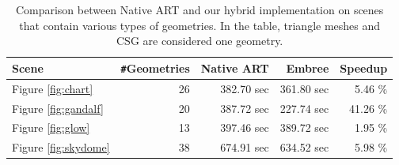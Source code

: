 \begin{table}
	\centering
	{\footnotesize\sf
		\begin{tabular}{lrrrr}
			\toprule
			Scene & \Verb!#!Geometries & Native ART & Embree & Speedup \\ 
			\midrule
			Figure \ref{fig:chart} & 26 & 382.70 sec & 361.80 sec & 5.46 \% \\
			Figure \ref{fig:gandalf} & 20 & 387.72 sec & 227.74 sec & 41.26 \% \\
			Figure \ref{fig:glow} & 13 & 397.46 sec & 389.72 sec & 1.95 \%  \\
			Figure \ref{fig:skydome} & 38 & 674.91 sec & 634.52 sec & 5.98 \% \\
			\bottomrule
	\end{tabular}}
	\caption{Comparison between Native ART and our hybrid implementation on scenes that contain various types of geometries. In the table, triangle meshes and CSG are considered one geometry.}
	\label{tab:scenes}
\end{table}



